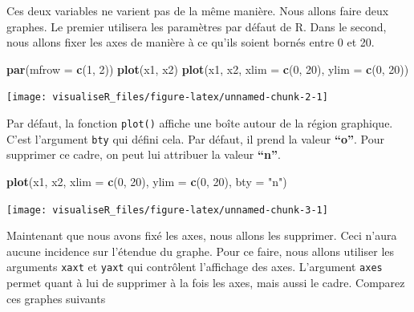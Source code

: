 \documentclass[]{article}
\newenvironment{Shaded}{\begin{snugshade}}{\end{snugshade}}
\newcommand{\DataTypeTok}[1]{\textcolor[rgb]{0.13,0.29,0.53}{#1}}
\newcommand{\DecValTok}[1]{\textcolor[rgb]{0.00,0.00,0.81}{#1}}
\newcommand{\KeywordTok}[1]{\textcolor[rgb]{0.13,0.29,0.53}{\textbf{#1}}}
\newcommand{\NormalTok}[1]{#1}
\newcommand{\StringTok}[1]{\textcolor[rgb]{0.31,0.60,0.02}{#1}}
\begin{document}
Ces deux variables ne varient pas de la même manière. Nous allons faire deux graphes. Le premier utilisera les paramètres par défaut de R. Dans le second, nous allons fixer les axes de manière à ce qu'ils soient bornés entre 0 et 20.

\begin{Shaded}
\begin{Highlighting}[]
\KeywordTok{par}\NormalTok{(}\DataTypeTok{mfrow =} \KeywordTok{c}\NormalTok{(}\DecValTok{1}\NormalTok{, }\DecValTok{2}\NormalTok{))}
\KeywordTok{plot}\NormalTok{(x1, x2)}
\KeywordTok{plot}\NormalTok{(x1, x2, }\DataTypeTok{xlim =} \KeywordTok{c}\NormalTok{(}\DecValTok{0}\NormalTok{, }\DecValTok{20}\NormalTok{), }\DataTypeTok{ylim =} \KeywordTok{c}\NormalTok{(}\DecValTok{0}\NormalTok{, }\DecValTok{20}\NormalTok{))}
\end{Highlighting}
\end{Shaded}

\begin{center}\texttt{[image: visualiseR\_files/figure-latex/unnamed-chunk-2-1]} \end{center}

Par défaut, la fonction \texttt{plot()} affiche une boîte autour de la région graphique. C'est l'argument \texttt{bty} qui défini cela. Par défaut, il prend la valeur \textbf{``o''}. Pour supprimer ce cadre, on peut lui attribuer la valeur \textbf{``n''}.

\begin{Shaded}
\begin{Highlighting}[]
\KeywordTok{plot}\NormalTok{(x1, x2, }\DataTypeTok{xlim =} \KeywordTok{c}\NormalTok{(}\DecValTok{0}\NormalTok{, }\DecValTok{20}\NormalTok{), }\DataTypeTok{ylim =} \KeywordTok{c}\NormalTok{(}\DecValTok{0}\NormalTok{, }\DecValTok{20}\NormalTok{), }\DataTypeTok{bty =} \StringTok{"n"}\NormalTok{)}
\end{Highlighting}
\end{Shaded}

\begin{center}\texttt{[image: visualiseR\_files/figure-latex/unnamed-chunk-3-1]} \end{center}

Maintenant que nous avons fixé les axes, nous allons les supprimer. Ceci n'aura aucune incidence sur l'étendue du graphe. Pour ce faire, nous allons utiliser les arguments \texttt{xaxt} et \texttt{yaxt} qui contrôlent l'affichage des axes. L'argument \texttt{axes} permet quant à lui de supprimer à la fois les axes, mais aussi le cadre. Comparez ces graphes suivants
\end{document}
